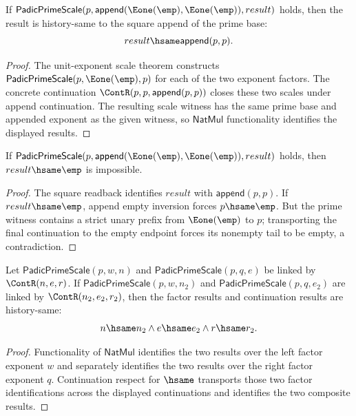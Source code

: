 \begin{theorem}
\label{thm:padic-prime-scale-append-unit-exponents-result-square}
If
\(\mathsf{PadicPrimeScale}(p,\mathsf{append}(\Eone(\emp),\Eone(\emp)),result)\)
holds, then the result is history-same to the square append of the prime base:
$$
result\hsame \mathsf{append}(p,p).
$$
\end{theorem}
\begin{proof}
The unit-exponent scale theorem constructs
\(\mathsf{PadicPrimeScale}(p,\Eone(\emp),p)\) for each of the two exponent
factors. The concrete continuation \(\ContR(p,p,\mathsf{append}(p,p))\)
closes these two scales under append continuation. The resulting scale witness
has the same prime base and appended exponent as the given witness, so
\(\mathsf{NatMul}\) functionality identifies the displayed results.
\end{proof}

\begin{theorem}
\label{thm:padic-prime-scale-append-unit-exponents-result-not-empty}
If
\(\mathsf{PadicPrimeScale}(p,\mathsf{append}(\Eone(\emp),\Eone(\emp)),result)\)
holds, then \(result\hsame\emp\) is impossible.
\end{theorem}
\begin{proof}
The square readback identifies \(result\) with \(\mathsf{append}(p,p)\).
If \(result\hsame\emp\), append empty inversion forces \(p\hsame\emp\). But the
prime witness contains a strict unary prefix from \(\Eone(\emp)\) to \(p\);
transporting the final continuation to the empty endpoint forces its nonempty
tail to be empty, a contradiction.
\end{proof}

\begin{theorem}
\label{thm:padic-prime-scale-append-factor-results-unique}
Let $\mathsf{PadicPrimeScale}(p,w,n)$ and
$\mathsf{PadicPrimeScale}(p,q,e)$ be linked by $\ContR(n,e,r)$. If
$\mathsf{PadicPrimeScale}(p,w,n_2)$ and
$\mathsf{PadicPrimeScale}(p,q,e_2)$ are linked by $\ContR(n_2,e_2,r_2)$, then
the factor results and continuation results are history-same:
$$
n\hsame n_2\land e\hsame e_2\land r\hsame r_2.
$$
\end{theorem}
\begin{proof}
Functionality of $\mathsf{NatMul}$ identifies the two results over the left
factor exponent $w$ and separately identifies the two results over the right
factor exponent $q$. Continuation respect for $\hsame$ transports those two
factor identifications across the displayed continuations and identifies the
two composite results.
\end{proof}

